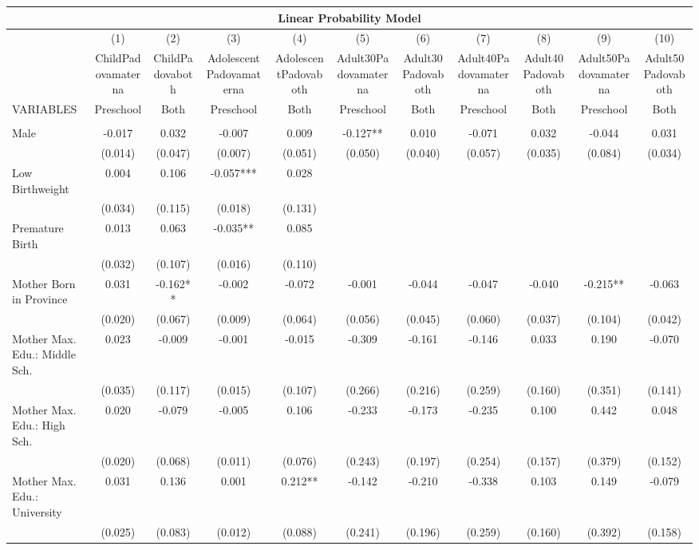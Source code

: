 \begin{tabular}{lcccccccccc}
\multicolumn{11}{c}{Linear Probability Model} \\ \hline
 & (1) & (2) & (3) & (4) & (5) & (6) & (7) & (8) & (9) & (10) \\
 & ChildPadovamaterna & ChildPadovaboth & AdolescentPadovamaterna & AdolescentPadovaboth & Adult30Padovamaterna & Adult30Padovaboth & Adult40Padovamaterna & Adult40Padovaboth & Adult50Padovamaterna & Adult50Padovaboth \\
VARIABLES & Preschool & Both & Preschool & Both & Preschool & Both & Preschool & Both & Preschool & Both \\ \hline
 &  &  &  &  &  &  &  &  &  &  \\
Male & -0.017 & 0.032 & -0.007 & 0.009 & -0.127** & 0.010 & -0.071 & 0.032 & -0.044 & 0.031 \\
 & (0.014) & (0.047) & (0.007) & (0.051) & (0.050) & (0.040) & (0.057) & (0.035) & (0.084) & (0.034) \\
Low Birthweight & 0.004 & 0.106 & -0.057*** & 0.028 &  &  &  &  &  &  \\
 & (0.034) & (0.115) & (0.018) & (0.131) &  &  &  &  &  &  \\
Premature Birth & 0.013 & 0.063 & -0.035** & 0.085 &  &  &  &  &  &  \\
 & (0.032) & (0.107) & (0.016) & (0.110) &  &  &  &  &  &  \\
Mother Born in Province & 0.031 & -0.162** & -0.002 & -0.072 & -0.001 & -0.044 & -0.047 & -0.040 & -0.215** & -0.063 \\
 & (0.020) & (0.067) & (0.009) & (0.064) & (0.056) & (0.045) & (0.060) & (0.037) & (0.104) & (0.042) \\
Mother Max. Edu.: Middle Sch. & 0.023 & -0.009 & -0.001 & -0.015 & -0.309 & -0.161 & -0.146 & 0.033 & 0.190 & -0.070 \\
 & (0.035) & (0.117) & (0.015) & (0.107) & (0.266) & (0.216) & (0.259) & (0.160) & (0.351) & (0.141) \\
Mother Max. Edu.: High Sch. & 0.020 & -0.079 & -0.005 & 0.106 & -0.233 & -0.173 & -0.235 & 0.100 & 0.442 & 0.048 \\
 & (0.020) & (0.068) & (0.011) & (0.076) & (0.243) & (0.197) & (0.254) & (0.157) & (0.379) & (0.152) \\
Mother Max. Edu.: University & 0.031 & 0.136 & 0.001 & 0.212** & -0.142 & -0.210 & -0.338 & 0.103 & 0.149 & -0.079 \\
 & (0.025) & (0.083) & (0.012) & (0.088) & (0.241) & (0.196) & (0.259) & (0.160) & (0.392) & (0.158) \\

\end{tabular}
